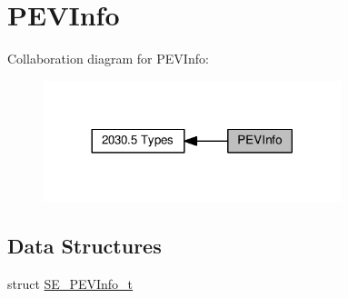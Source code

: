 \hypertarget{group__PEVInfo}{}\section{P\+E\+V\+Info}
\label{group__PEVInfo}
Collaboration diagram for P\+E\+V\+Info\+:\nopagebreak
\begin{figure}[H]
\begin{center}
\leavevmode
\includegraphics[width=245pt]{group__PEVInfo}
\end{center}
\end{figure}
\subsection*{Data Structures}
\begin{DoxyCompactItemize}
\item 
struct \hyperlink{structSE__PEVInfo__t}{S\+E\+\_\+\+P\+E\+V\+Info\+\_\+t}
\end{DoxyCompactItemize}
